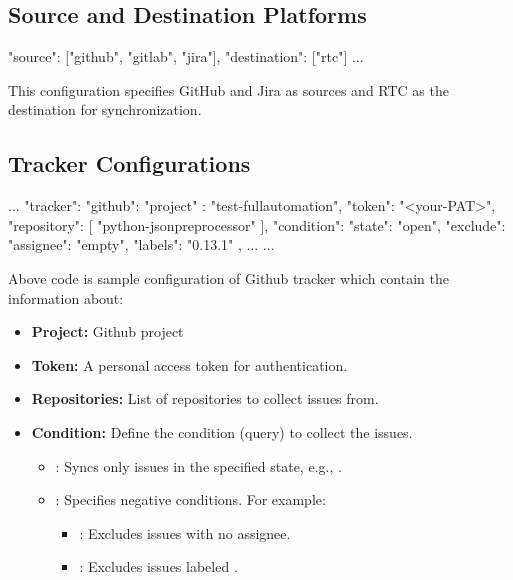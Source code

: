 \subsection{Source and Destination Platforms}
\begin{pythoncode}
{
   "source": ["github", "gitlab", "jira"],
   "destination": ["rtc"]
   ...
}
\end{pythoncode}
This configuration specifies GitHub and Jira as sources and RTC as the
destination for synchronization.

\subsection{Tracker Configurations}
\begin{pythoncode}
{
   ...
   "tracker": {
      "github": {
         "project" : "test-fullautomation",
         "token": "<your-PAT>",
         "repository": [
            "python-jsonpreprocessor"
         ],
         "condition": {
            "state": "open",
            "exclude": {
               "assignee": "empty",
               "labels": "0.13.1"
            }
         }
      },
      ...
   }
   ...
}
\end{pythoncode}

Above code is sample configuration of Github tracker which contain the
information about:

\begin{itemize}
    \item \textbf{Project:} Github project 
    \item \textbf{Token:} A personal access token for authentication.
    \item \textbf{Repositories:} List of repositories to collect issues from.
    \item \textbf{Condition:} Define the condition (query) to collect the issues.
          \begin{itemize}
            \item {}: Syncs only issues in the specified state,
                  e.g., .
            \item {}: Specifies negative conditions. For example:
            \begin{itemize}
               \item {}: Excludes issues with no assignee.
               \item {}: Excludes issues labeled .
            \end{itemize}
          \end{itemize}
\end{itemize}

